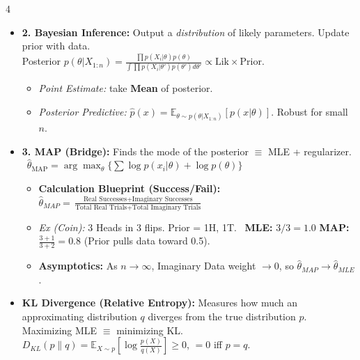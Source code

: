 \documentclass[9pt]{extarticle}
\begin{document}
\begin{multicols*}{4}
\begin{itemize}
    \item \textbf{2. Bayesian Inference:} Output a \textit{distribution} of likely parameters. Update prior with data.
    \\
    Posterior $p(\theta|X_{1:n}) = \frac{\prod p(X_i|\theta)p(\theta)}{\int \prod p(X_i|\theta')p(\theta')d\theta'} \propto \text{Lik} \times \text{Prior}$.
    \begin{itemize}
        \item \textit{Point Estimate:} take \textbf{Mean} of posterior.
        \item \textit{Posterior Predictive:} $\hat{p}(x) = \mathbb{E}_{\theta \sim p(\theta|X_{1:n})}[p(x|\theta)]$. Robust for small $n$.
    \end{itemize}
    
    \item \textbf{3. MAP (Bridge):} Finds the mode of the posterior $\equiv$ MLE + regularizer.
    \ $\hat{\theta}_{\text{MAP}} = \arg \max_\theta \{ \sum \log p(x_i|\theta) + \log p(\theta) \}$
    \begin{itemize}
    \item \textbf{Calculation Blueprint (Success/Fail):}
    \ $\hat{\theta}_{MAP} = \frac{\text{Real Successes} + \text{Imaginary Successes}}{\text{Total Real Trials} + \text{Total Imaginary Trials}}$
    \item \textit{Ex (Coin):} 3 Heads in 3 flips. Prior = 1H, 1T.
    \ \textbf{MLE:} $3/3 = \mathbf{1.0}$ \quad \textbf{MAP:} $\frac{3+1}{3+2} = \mathbf{0.8}$ (Prior pulls data toward 0.5).
    \item \textbf{Asymptotics:} As $n \to \infty$, Imaginary Data weight $\to 0$, so $\hat{\theta}_{MAP} \to \hat{\theta}_{MLE}$.
    \end{itemize}
    \item \textbf{KL Divergence (Relative Entropy):} Measures how much an approximating distribution $q$ diverges from the true distribution $p$. Maximizing MLE $\equiv$ minimizing KL.
    \\
    $D_{KL}(p\|q) = \mathbb{E}_{X \sim p}\left[\log\frac{p(X)}{q(X)}\right] \ge 0$, $=0$ iff $p=q$.
\end{itemize}
 

\end{multicols*}
\end{document}
